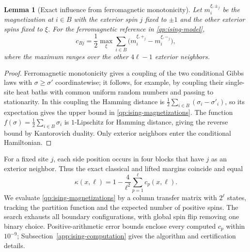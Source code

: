 \documentclass[11pt,a4paper]{article}
\newtheorem{lemma}{Lemma}[section]
\theoremstyle{remark}
\begin{document}
\begin{lemma}[Exact influence from ferromagnetic monotonicity]
\label{qp:ising-influence}
Let $m_i^{\xi,\pm_j}$ be the magnetization at $i\in B$ with the
exterior spin $j$ fixed to $\pm1$ and the other exterior spins fixed
to $\xi$. For the ferromagnetic reference in \eqref{qp:ising-model},
\begin{equation}
 c_{Bj}=\frac12\max_\xi\sum_{i\in B}
       \bigl(m_i^{\xi,+_j}-m_i^{\xi,-_j}\bigr),
 \label{qp:ising-magnetizations}
\end{equation}
where the maximum ranges over the other $4\ell-1$ exterior neighbors.
\end{lemma}
\begin{proof}
Ferromagnetic monotonicity gives a coupling of the two conditional
Gibbs laws with $\sigma\ge\sigma'$ coordinatewise; it follows, for
example, by coupling their single-site heat baths with common uniform
random numbers and passing to stationarity. In this coupling the
Hamming distance is $\frac12\sum_{i\in B}(\sigma_i-\sigma'_i)$,
so its expectation gives the upper bound in
\eqref{qp:ising-magnetizations}. The function
$f(\sigma)=\frac12\sum_{i\in B}\sigma_i$ is $1$-Lipschitz for
Hamming distance, giving the reverse bound by Kantorovich duality.
Only exterior neighbors enter the conditional Hamiltonian.
\end{proof}

For a fixed site $j$, each side position occurs in four blocks
that have $j$ as an exterior neighbor. Thus the exact classical
and lifted margins coincide and equal
\begin{equation}
 \kappa(x,\ell)=1-\frac4{\ell^2}\sum_{p=1}^{\ell}c_p(x,\ell).
 \label{qp:ising-margin}
\end{equation}
We evaluate \eqref{qp:ising-magnetizations} by a column transfer
matrix with $2^\ell$ states, tracking the partition function and
the expected number of positive spins. The search exhausts all
boundary configurations, with global spin flip removing one binary
choice. Positive-arithmetic error bounds enclose every computed
$c_p$ within $10^{-9}$; Subsection~\ref{app:ising-computation}
gives the algorithm and certification details.
\end{document}

